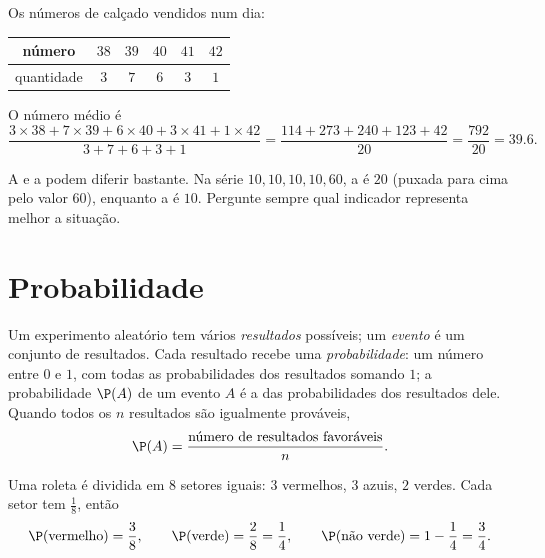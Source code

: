\begin{example}\label{ex:g9:statproba:weighted}
Os números de calçado vendidos num dia:
\begin{center}
\renewcommand{\arraystretch}{1.2}
\begin{tabular}{c|ccccc}
número & $38$ & $39$ & $40$ & $41$ & $42$ \\
\hline
quantidade & $3$ & $7$ & $6$ & $3$ & $1$ \\
\end{tabular}
\end{center}
O número médio é
\[
\frac{3 \times 38 + 7 \times 39 + 6 \times 40 + 3 \times 41 + 1 \times 42}
{3 + 7 + 6 + 3 + 1}
= \frac{114 + 273 + 240 + 123 + 42}{20}
= \frac{792}{20} = 39.6 .
\]
\end{example}

\begin{remark}
A  e a  podem diferir bastante. Na série
$10, 10, 10, 10, 60$, a  é $20$ (puxada para cima pelo valor
$60$), enquanto a  é $10$. Pergunte sempre qual indicador
representa melhor a situação.
\end{remark}

\section{Probabilidade}

\begin{definition}[Probabilidade]\label{def:g9:statproba:probability}
Um experimento aleatório tem vários \emph{resultados} possíveis; um
\emph{evento} é um conjunto de resultados. Cada resultado recebe uma
\emph{probabilidade}: um número entre $0$ e $1$,
com todas as probabilidades dos resultados somando $1$; a probabilidade
$\P(A)$ de um evento $A$ é a  das probabilidades dos resultados
dele. Quando todos os $n$ resultados são igualmente prováveis,
\[
\P(A) = \frac{\text{número de resultados favoráveis}}{n}.
\]
\end{definition}

\begin{example}\label{ex:g9:statproba:spinner}
Uma roleta é dividida em $8$ setores iguais: $3$ vermelhos, $3$ azuis,
$2$ verdes. Cada setor tem  $\frac18$, então
\[
\P(\text{vermelho}) = \frac38, \qquad
\P(\text{verde}) = \frac28 = \frac14, \qquad
\P(\text{não verde}) = 1 - \frac14 = \frac34 .
\]
\end{example}

